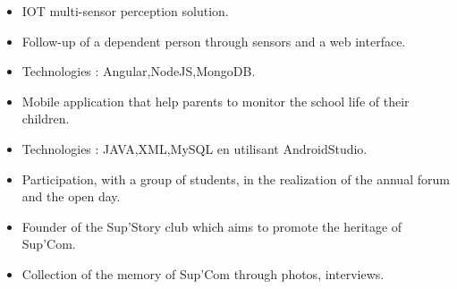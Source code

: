 \documentclass[9pt,a4paper,ragged2e,normalphoto]{altacv}
\begin{document}
\divider

\begin{itemize}
\item IOT multi-sensor perception solution.
\item Follow-up of a dependent person through sensors and a web interface.  
\item Technologies : Angular,NodeJS,MongoDB.
\end{itemize}

\divider

\begin{itemize}
\item Mobile application that help parents to monitor the school life of their children.    
\item Technologies : JAVA,XML,MySQL en utilisant AndroidStudio.
\end{itemize}




{}

{}


\begin{itemize}
\item Participation, with a group of students, in the realization of the annual forum and the open day.
\end{itemize}

\divider

\begin{itemize}
\item Founder of the Sup'Story club which aims to promote the heritage of Sup'Com.
\item Collection of the memory of Sup'Com through photos, interviews.
\end{itemize}


\clearpage
\end{document}
